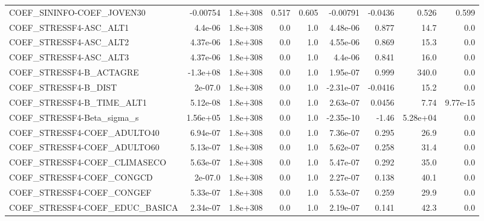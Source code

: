\begin{tabular}{lrrrrrrrr}
COEF\_SININFO-COEF\_JOVEN30         &    -0.00754 &     1.8e+308 &   0.517 &    0.605 &   -0.00791 &     -0.0436 &        0.526 &         0.599 \\
COEF\_STRESSF4-ASC\_ALT1            &     4.4e-06 &     1.8e+308 &     0.0 &      1.0 &   4.48e-06 &       0.877 &         14.7 &           0.0 \\
COEF\_STRESSF4-ASC\_ALT2            &    4.37e-06 &     1.8e+308 &     0.0 &      1.0 &   4.55e-06 &       0.869 &         15.3 &           0.0 \\
COEF\_STRESSF4-ASC\_ALT3            &    4.37e-06 &     1.8e+308 &     0.0 &      1.0 &    4.4e-06 &       0.841 &         16.0 &           0.0 \\
COEF\_STRESSF4-B\_ACTAGRE           &    -1.3e+08 &     1.8e+308 &     0.0 &      1.0 &   1.95e-07 &       0.999 &        340.0 &           0.0 \\
COEF\_STRESSF4-B\_DIST              &     2e-07.0 &     1.8e+308 &     0.0 &      1.0 &  -2.31e-07 &     -0.0416 &         15.2 &           0.0 \\
COEF\_STRESSF4-B\_TIME\_ALT1         &    5.12e-08 &     1.8e+308 &     0.0 &      1.0 &   2.63e-07 &      0.0456 &         7.74 &      9.77e-15 \\
COEF\_STRESSF4-Beta\_sigma\_s        &    1.56e+05 &     1.8e+308 &     0.0 &      1.0 &  -2.35e-10 &       -1.46 &     5.28e+04 &           0.0 \\
COEF\_STRESSF4-COEF\_ADULTO40       &    6.94e-07 &     1.8e+308 &     0.0 &      1.0 &   7.36e-07 &       0.295 &         26.9 &           0.0 \\
COEF\_STRESSF4-COEF\_ADULTO60       &    5.13e-07 &     1.8e+308 &     0.0 &      1.0 &   5.62e-07 &       0.258 &         31.4 &           0.0 \\
COEF\_STRESSF4-COEF\_CLIMASECO      &    5.63e-07 &     1.8e+308 &     0.0 &      1.0 &   5.47e-07 &       0.292 &         35.0 &           0.0 \\
COEF\_STRESSF4-COEF\_CONGCD         &     2e-07.0 &     1.8e+308 &     0.0 &      1.0 &   2.27e-07 &       0.138 &         40.1 &           0.0 \\
COEF\_STRESSF4-COEF\_CONGEF         &    5.33e-07 &     1.8e+308 &     0.0 &      1.0 &   5.53e-07 &       0.259 &         29.9 &           0.0 \\
COEF\_STRESSF4-COEF\_EDUC\_BASICA    &    2.34e-07 &     1.8e+308 &     0.0 &      1.0 &   2.19e-07 &       0.141 &         42.3 &           0.0 \\

\end{tabular}
